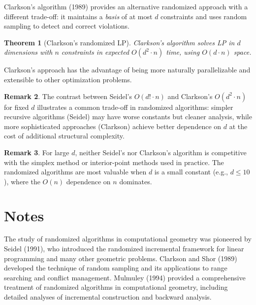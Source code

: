 \documentclass[twoside,12pt]{book}
\theoremstyle{plain}
\newtheorem{theorem}{Theorem}[chapter]
\theoremstyle{definition}
\newtheorem{remark}[theorem]{Remark}
\theoremstyle{remark}
\begin{document}
Clarkson's algorithm (1989) provides an alternative randomized approach with a different trade-off: it maintains a \emph{basis} of at most $d$ constraints and uses random sampling to detect and correct violations.

\begin{theorem}[Clarkson's randomized LP]
\label{thm:clarkson-lp}
Clarkson's algorithm solves LP in $d$ dimensions with $n$ constraints in expected $O(d^2 \cdot n)$ time, using $O(d \cdot n)$ space.
\end{theorem}

Clarkson's approach has the advantage of being more naturally parallelizable and extensible to other optimization problems.

\begin{remark}
The contrast between Seidel's $O(d! \cdot n)$ and Clarkson's $O(d^2 \cdot n)$ for fixed $d$ illustrates a common trade-off in randomized algorithms: simpler recursive algorithms (Seidel) may have worse constants but cleaner analysis, while more sophisticated approaches (Clarkson) achieve better dependence on $d$ at the cost of additional structural complexity.
\end{remark}

\begin{remark}
For large $d$, neither Seidel's nor Clarkson's algorithm is competitive with the simplex method or interior-point methods used in practice. The randomized algorithms are most valuable when $d$ is a small constant (e.g., $d \leq 10$), where the $O(n)$ dependence on $n$ dominates.
\end{remark}

\section*{Notes}
\label{sec:notes-9}

The study of randomized algorithms in computational geometry was pioneered by Seidel (1991), who introduced the randomized incremental framework for linear programming and many other geometric problems. Clarkson and Shor (1989) developed the technique of random sampling and its applications to range searching and conflict management. Mulmuley (1994) provided a comprehensive treatment of randomized algorithms in computational geometry, including detailed analyses of incremental construction and backward analysis.
\end{document}
